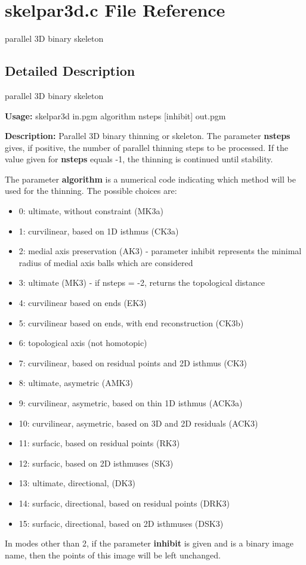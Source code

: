 \section{skelpar3d.c File Reference}
\label{skelpar3d_8c}
parallel 3D binary skeleton  




\label{_details}
\subsection{Detailed Description}
parallel 3D binary skeleton 

{\bf Usage:} skelpar3d in.pgm algorithm nsteps [inhibit] out.pgm

{\bf Description:} Parallel 3D binary thinning or skeleton. The parameter {\bf nsteps} gives, if positive, the number of parallel thinning steps to be processed. If the value given for {\bf nsteps} equals -1, the thinning is continued until stability.

The parameter {\bf algorithm} is a numerical code indicating which method will be used for the thinning. The possible choices are: \begin{itemize}
\item 0: ultimate, without constraint (MK3a) \item 1: curvilinear, based on 1D isthmus (CK3a) \item 2: medial axis preservation (AK3) - parameter inhibit represents the minimal radius of medial axis balls which are considered \item 3: ultimate (MK3) - if nsteps = -2, returns the topological distance \item 4: curvilinear based on ends (EK3) \item 5: curvilinear based on ends, with end reconstruction (CK3b) \item 6: topological axis (not homotopic) \item 7: curvilinear, based on residual points and 2D isthmus (CK3) \item 8: ultimate, asymetric (AMK3) \item 9: curvilinear, asymetric, based on thin 1D isthmus (ACK3a) \item 10: curvilinear, asymetric, based on 3D and 2D residuals (ACK3) \item 11: surfacic, based on residual points (RK3) \item 12: surfacic, based on 2D isthmuses (SK3) \item 13: ultimate, directional, (DK3) \item 14: surfacic, directional, based on residual points (DRK3) \item 15: surfacic, directional, based on 2D isthmuses (DSK3)\end{itemize}
In modes other than 2, if the parameter {\bf inhibit} is given and is a binary image name, then the points of this image will be left unchanged.

